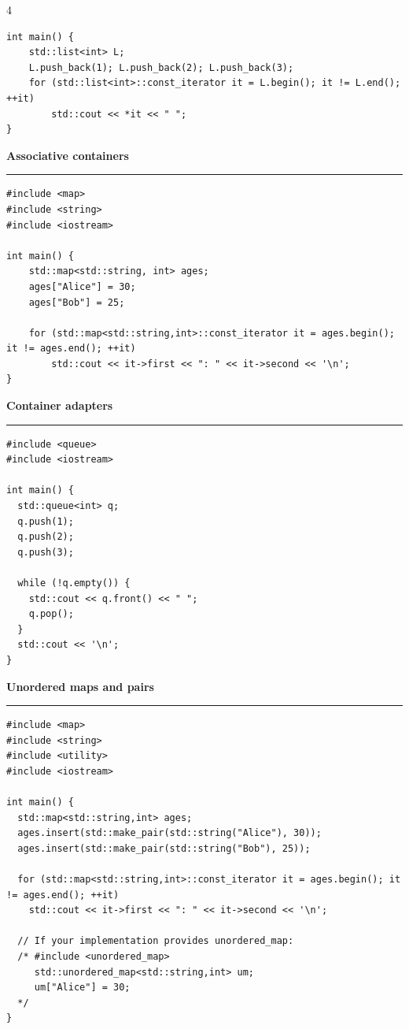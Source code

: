 \documentclass[final]{beamer}
\renewcommand{\subsection}[1]{%
  \par\vspace{1em}%
  {\noindent\large\bfseries #1\par}%
  \vspace{0.5em}\hrule\vspace{1em}%

}
\begin{document}
\begin{frame}[t,fragile]
\begin{multicols}{4}
\begin{lstlisting}
int main() {
    std::list<int> L;
    L.push_back(1); L.push_back(2); L.push_back(3);
    for (std::list<int>::const_iterator it = L.begin(); it != L.end(); ++it)
        std::cout << *it << " ";
}
\end{lstlisting}

\subsection{Associative containers}

\begin{lstlisting}
#include <map>
#include <string>
#include <iostream>

int main() {
    std::map<std::string, int> ages;
    ages["Alice"] = 30;
    ages["Bob"] = 25;

    for (std::map<std::string,int>::const_iterator it = ages.begin(); it != ages.end(); ++it)
        std::cout << it->first << ": " << it->second << '\n';
}
\end{lstlisting}

\subsection{Container adapters}

\begin{lstlisting}
#include <queue>
#include <iostream>

int main() {
  std::queue<int> q;
  q.push(1);
  q.push(2);
  q.push(3);

  while (!q.empty()) {
    std::cout << q.front() << " ";
    q.pop();
  }
  std::cout << '\n';
}
\end{lstlisting}

\subsection{Unordered maps and pairs}

\begin{lstlisting}
#include <map>
#include <string>
#include <utility>
#include <iostream>

int main() {
  std::map<std::string,int> ages;
  ages.insert(std::make_pair(std::string("Alice"), 30));
  ages.insert(std::make_pair(std::string("Bob"), 25));

  for (std::map<std::string,int>::const_iterator it = ages.begin(); it != ages.end(); ++it)
    std::cout << it->first << ": " << it->second << '\n';

  // If your implementation provides unordered_map:
  /* #include <unordered_map>
     std::unordered_map<std::string,int> um;
     um["Alice"] = 30;
  */
}
\end{lstlisting}


\end{multicols}
\end{frame}
\end{document}
